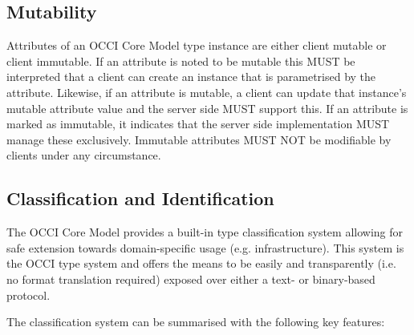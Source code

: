 \documentclass[10pt,a4paper]{article}
\begin{document}
\subsection{Mutability}
\label{sec:mutability}
Attributes of an OCCI Core Model type instance are either client
mutable or client immutable. If an attribute is noted to be mutable
this MUST be interpreted that a client can create an instance that is
parametrised by the attribute. Likewise, if an attribute is mutable, a
client can update that instance's mutable attribute value and the
server side MUST support this. If an attribute is marked as immutable,
it indicates that the server side implementation MUST manage these
exclusively. Immutable attributes MUST NOT be modifiable by clients
under any circumstance.

\subsection{Classification and Identification}
\label{sec:classification}
The OCCI Core Model provides a built-in type classification system
allowing for safe extension towards domain-specific usage
(e.g. infrastructure). This system is the OCCI type system and offers
the means to be easily and transparently (i.e. no format translation
required) exposed over either a text- or binary-based protocol.

The classification system can be summarised with the following key
features:
\end{document}
